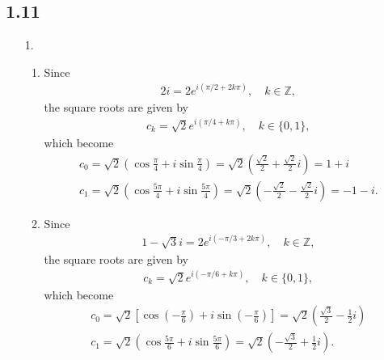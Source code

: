 \documentclass[a4paper,12pt]{article}
\begin{document}
\subsection*{1.11}
\begin{enumerate}
    \item[1.]
        \begin{enumerate}
            \item
                Since
                \begin{align*}
                    2i = 2e^{i(\pi/2 + 2k\pi)}, \quad k \in \mathbb{Z},
                \end{align*}
                the square roots are given by
                \begin{align*}
                    c_k = \sqrt{2} e^{i(\pi/4 + k\pi)}, \quad k \in \{ 0, 1 \},
                \end{align*}
                which become
                \begin{gather*}
                    c_0 = \sqrt{2} \left( \cos\frac{\pi}{4} + i\sin\frac{\pi}{4} \right) = \sqrt{2} \left( \frac{\sqrt{2}}{2} + \frac{\sqrt{2}}{2}i \right) = 1 + i \\
                    c_1 = \sqrt{2} \left( \cos\frac{5\pi}{4} + i\sin\frac{5\pi}{4} \right) = \sqrt{2} \left( -\frac{\sqrt{2}}{2} - \frac{\sqrt{2}}{2}i \right) = -1 - i.
                \end{gather*}

            \item
                Since
                \begin{align*}
                    1 - \sqrt{3} i = 2e^{i(-\pi/3 + 2k\pi)}, \quad k \in \mathbb{Z},
                \end{align*}
                the square roots are given by
                \begin{align*}
                    c_k = \sqrt{2} e^{i(-\pi/6 + k\pi)}, \quad k \in \{ 0, 1 \},
                \end{align*}
                which become
                \begin{gather*}
                    c_0 = \sqrt{2} \left[ \cos \left( -\frac{\pi}{6} \right) + i\sin \left( -\frac{\pi}{6} \right) \right] = \sqrt{2} \left( \frac{\sqrt{3}}{2} - \frac{1}{2}i \right) \\
                    c_1 = \sqrt{2} \left( \cos\frac{5\pi}{6} + i\sin\frac{5\pi}{6} \right) = \sqrt{2} \left( -\frac{\sqrt{3}}{2} + \frac{1}{2}i \right).
                \end{gather*}
        \end{enumerate}


\end{enumerate}
\end{document}

